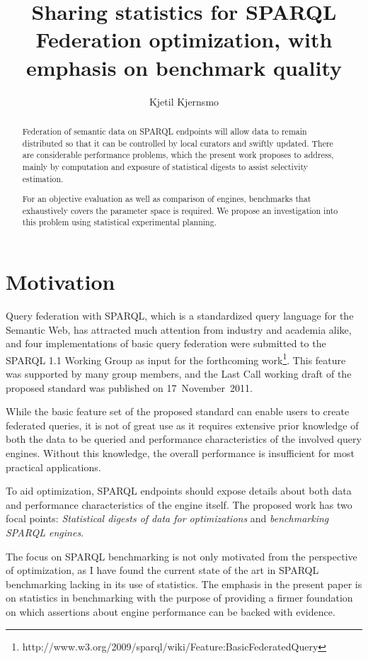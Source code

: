 \documentclass{llncs}
\title{Sharing statistics for SPARQL Federation optimization, with
  emphasis on benchmark quality}
\author{Kjetil Kjernsmo\inst{1}}
\institute{Department of Informatics,
Postboks 1080 Blindern,
0316 Oslo, Norway
\email{kjekje@ifi.uio.no}}
\begin{document}
\maketitle



\begin{abstract}
  Federation of semantic data on SPARQL endpoints will allow data to
  remain distributed so that it can be controlled by local curators
  and swiftly updated. There are considerable performance problems,
  which the present work proposes to address, mainly by computation
  and exposure of statistical digests to assist selectivity
  estimation.

  For an objective evaluation as well as comparison of engines,
  benchmarks that exhaustively covers the parameter space is
  required. We propose an investigation into this problem using
  statistical experimental planning.
\end{abstract}

\section{Motivation}

Query federation with SPARQL, which is a standardized query language
for the Semantic Web, has attracted much attention
from industry and academia alike, and four implementations of basic
query federation were submitted to the SPARQL 1.1 Working Group as
input for the forthcoming
work\footnote{http://www.w3.org/2009/sparql/wiki/Feature:BasicFederatedQuery}. 
This feature was
supported by many group members, and the Last Call working
draft of the proposed standard was published on 17~November~2011.

While the basic feature set of the proposed standard can enable users
to create federated queries, it is not of great use as it requires
extensive prior knowledge of both the data to be queried and
performance characteristics of the involved query engines. Without
this knowledge, the overall performance is insufficient for most
practical applications.

To aid optimization, SPARQL endpoints should expose details about both
data and performance characteristics of the engine itself. The
proposed work has two focal points: \emph{Statistical digests of
  data for optimizations} and \emph{benchmarking SPARQL engines}. 

The focus on SPARQL benchmarking is not only motivated from the
perspective of optimization, as I have found the current state of the art
in SPARQL benchmarking lacking in its use of statistics. The emphasis
in the present paper is on statistics in benchmarking with the purpose
of providing a firmer foundation on which assertions about engine
performance can be backed with evidence. 
\end{document}
